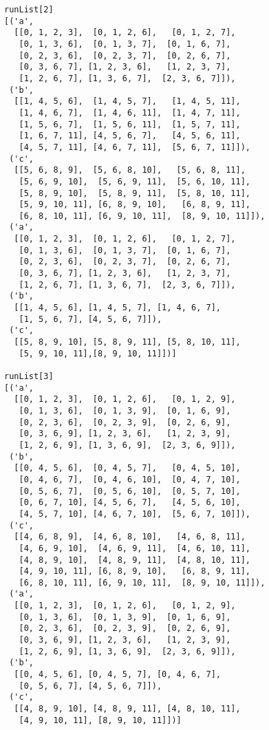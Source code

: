 \begin{verbatim}
runList[2]
[('a',
  [[0, 1, 2, 3],  [0, 1, 2, 6],   [0, 1, 2, 7],
   [0, 1, 3, 6],  [0, 1, 3, 7],  [0, 1, 6, 7],
   [0, 2, 3, 6],  [0, 2, 3, 7],  [0, 2, 6, 7],
   [0, 3, 6, 7], [1, 2, 3, 6],   [1, 2, 3, 7],
   [1, 2, 6, 7], [1, 3, 6, 7],  [2, 3, 6, 7]]),
 ('b',
  [[1, 4, 5, 6],  [1, 4, 5, 7],   [1, 4, 5, 11],
   [1, 4, 6, 7],  [1, 4, 6, 11],  [1, 4, 7, 11],
   [1, 5, 6, 7],  [1, 5, 6, 11],  [1, 5, 7, 11],
   [1, 6, 7, 11], [4, 5, 6, 7],   [4, 5, 6, 11],
   [4, 5, 7, 11], [4, 6, 7, 11],  [5, 6, 7, 11]]),
 ('c',
  [[5, 6, 8, 9],  [5, 6, 8, 10],   [5, 6, 8, 11],
   [5, 6, 9, 10],  [5, 6, 9, 11],  [5, 6, 10, 11],
   [5, 8, 9, 10],  [5, 8, 9, 11],  [5, 8, 10, 11],
   [5, 9, 10, 11], [6, 8, 9, 10],   [6, 8, 9, 11],
   [6, 8, 10, 11], [6, 9, 10, 11],  [8, 9, 10, 11]]),
 ('a',
  [[0, 1, 2, 3],  [0, 1, 2, 6],   [0, 1, 2, 7],
   [0, 1, 3, 6],  [0, 1, 3, 7],  [0, 1, 6, 7],
   [0, 2, 3, 6],  [0, 2, 3, 7],  [0, 2, 6, 7],
   [0, 3, 6, 7], [1, 2, 3, 6],   [1, 2, 3, 7],
   [1, 2, 6, 7], [1, 3, 6, 7],  [2, 3, 6, 7]]),
 ('b', 
  [[1, 4, 5, 6], [1, 4, 5, 7], [1, 4, 6, 7], 
   [1, 5, 6, 7], [4, 5, 6, 7]]),
 ('c',
  [[5, 8, 9, 10], [5, 8, 9, 11], [5, 8, 10, 11],
   [5, 9, 10, 11],[8, 9, 10, 11]])]

runList[3]
[('a',
  [[0, 1, 2, 3],  [0, 1, 2, 6],   [0, 1, 2, 9],
   [0, 1, 3, 6],  [0, 1, 3, 9],  [0, 1, 6, 9],
   [0, 2, 3, 6],  [0, 2, 3, 9],  [0, 2, 6, 9],
   [0, 3, 6, 9], [1, 2, 3, 6],   [1, 2, 3, 9],
   [1, 2, 6, 9], [1, 3, 6, 9],  [2, 3, 6, 9]]),
 ('b',
  [[0, 4, 5, 6],  [0, 4, 5, 7],   [0, 4, 5, 10],
   [0, 4, 6, 7],  [0, 4, 6, 10],  [0, 4, 7, 10],
   [0, 5, 6, 7],  [0, 5, 6, 10],  [0, 5, 7, 10],
   [0, 6, 7, 10], [4, 5, 6, 7],   [4, 5, 6, 10],
   [4, 5, 7, 10], [4, 6, 7, 10],  [5, 6, 7, 10]]),
 ('c',
  [[4, 6, 8, 9],  [4, 6, 8, 10],   [4, 6, 8, 11],
   [4, 6, 9, 10],  [4, 6, 9, 11],  [4, 6, 10, 11],
   [4, 8, 9, 10],  [4, 8, 9, 11],  [4, 8, 10, 11],
   [4, 9, 10, 11], [6, 8, 9, 10],   [6, 8, 9, 11],
   [6, 8, 10, 11], [6, 9, 10, 11],  [8, 9, 10, 11]]),
 ('a',
  [[0, 1, 2, 3],  [0, 1, 2, 6],   [0, 1, 2, 9],
   [0, 1, 3, 6],  [0, 1, 3, 9],  [0, 1, 6, 9],
   [0, 2, 3, 6],  [0, 2, 3, 9],  [0, 2, 6, 9],
   [0, 3, 6, 9], [1, 2, 3, 6],   [1, 2, 3, 9],
   [1, 2, 6, 9], [1, 3, 6, 9],  [2, 3, 6, 9]]),
 ('b', 
  [[0, 4, 5, 6], [0, 4, 5, 7], [0, 4, 6, 7], 
   [0, 5, 6, 7], [4, 5, 6, 7]]),
 ('c',
  [[4, 8, 9, 10], [4, 8, 9, 11], [4, 8, 10, 11],
   [4, 9, 10, 11], [8, 9, 10, 11]])]


\end{verbatim}
